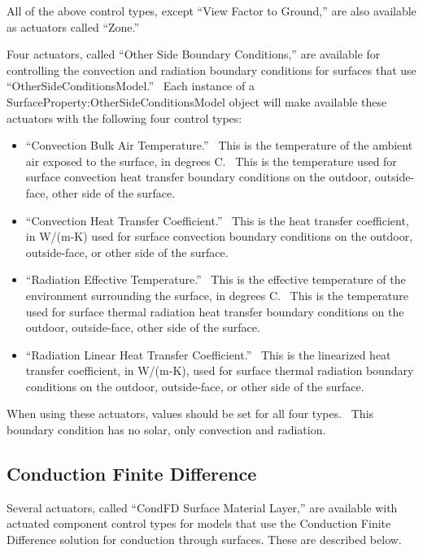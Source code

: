 All of the above control types, except ``View Factor to Ground,'' are also available as actuators called ``Zone.''

Four actuators, called ``Other Side Boundary Conditions,'' are available for controlling the convection and radiation boundary conditions for surfaces that use ``OtherSideConditionsModel.''~ Each instance of a SurfaceProperty:OtherSideConditionsModel object will make available these actuators with the following four control types:

\begin{itemize}
\item
  ``Convection Bulk Air Temperature.''~ This is the temperature of the ambient air exposed to the surface, in degrees C.~ This is the temperature used for surface convection heat transfer boundary conditions on the outdoor, outside-face, other side of the surface.
\item
  ``Convection Heat Transfer Coefficient.''~ This is the heat transfer coefficient, in W/(m-K) used for surface convection boundary conditions on the outdoor, outside-face, or other side of the surface.
\item
  ``Radiation Effective Temperature.''~ This is the effective temperature of the environment surrounding the surface, in degrees C.~ This is the temperature used for surface thermal radiation heat transfer boundary conditions on the outdoor, outside-face, other side of the surface.
\item
  ``Radiation Linear Heat Transfer Coefficient.''~ This is the linearized heat transfer coefficient, in W/(m-K), used for surface thermal radiation boundary conditions on the outdoor, outside-face, or other side of the surface.
\end{itemize}

When using these actuators, values should be set for all four types.~ This boundary condition has no solar, only convection and radiation.

\subsection{Conduction Finite Difference}\label{conduction-finite-difference}

Several actuators, called ``CondFD Surface Material Layer,'' are available with actuated component control types for models that use the Conduction Finite Difference solution for conduction through surfaces. These are described below.

